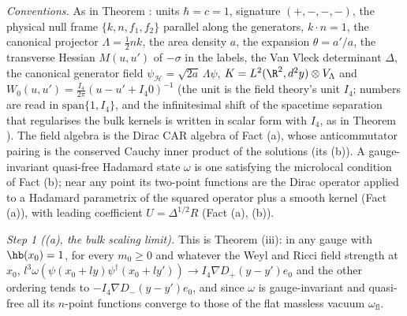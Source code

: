 \emph{Conventions.} As in Theorem : units $\hbar = c = 1$, signature $(+,-,-,-)$, the physical null frame $\{k, n, f_{1}, f_{2}\}$ parallel along the generators, $k\cdot n = 1$, the canonical projector $\Lambda = \tfrac12 nk$, the area density $a$, the expansion $\theta = a'/a$, the transverse Hessian $M(u, u')$ of $-\sigma$ in the labels, the Van Vleck determinant $\Delta$, the canonical generator field $\psi_{\mathcal{H}} = \sqrt{2a}\,\Lambda\psi$, $K = L^{2}(\R^{2}, d^{2}y)\otimes V_{\Lambda}$ and $W_{0}(u, u') = \tfrac{I_{4}}{2\pi}(u - u' + I_{4}0)^{-1}$ (the unit is the field theory's unit $I_{4}$; numbers are read in $\mathrm{span}\{1, I_{4}\}$, and the infinitesimal shift of the spacetime separation that regularises the bulk kernels is written in scalar form with $I_{4}$, as in Theorem ). The field algebra is the Dirac CAR algebra of Fact (a), whose anticommutator pairing is the conserved Cauchy inner product of the solutions (its (b)). A gauge-invariant quasi-free Hadamard state $\omega$ is one satisfying the microlocal condition of Fact (b); near any point its two-point functions are the Dirac operator applied to a Hadamard parametrix of the squared operator plus a smooth kernel (Fact (a)), with leading coefficient $U = \Delta^{1/2}R$ (Fact (a), (b)).

\emph{Step 1 ((a), the bulk scaling limit).} This is Theorem (iii): in any gauge with $\hb(x_{0}) = 1$, for every $m_{0} \ge 0$ and whatever the Weyl and Ricci field strength at $x_{0}$, $l^{3}\omega(\psi(x_{0} + ly)\psi^{\dagger}(x_{0} + ly')) \to I_{4}\nabla D_{+}(y - y')e_{0}$ and the other ordering tends to $-I_{4}\nabla D_{-}(y - y')e_{0}$, and since $\omega$ is gauge-invariant and quasi-free all its $n$-point functions converge to those of the flat massless vacuum $\omega_{\mathrm{fl}}$.

